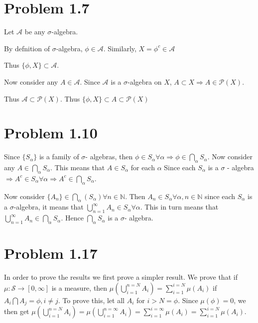 \documentclass[letterpaper,12pt]{article}
\theoremstyle{definition}
\begin{document}
 
 \section*{Problem 1.7}

Let $\mathcal{A}$ be any $\sigma$-algebra. 

By defnition of $\sigma$-algebra, $\phi \in \mathcal{A}$. Similarly, $X = {\phi}^c \in \mathcal{A}$

Thus $\{\phi, X\} \subset \mathcal{A}$.

 Now consider any $A \in \mathcal{A}$. Since $\mathcal{A}$ is a $\sigma$-algebra on $X$, $A \subset X \Rightarrow    A \in \mathcal{P}(X)$. 

Thus $\mathcal{A} \subset \mathcal{P}(X)$. Thus $\{\phi, X\} \subset A \subset \mathcal{P}(X)$

  \section*{Problem 1.10}

 Since $\{S_\alpha\}$ is a family of $\sigma$- algebras, then $\phi \in S_\alpha \forall \alpha \Rightarrow \phi \in    \bigcap_{\alpha}S_\alpha$. Now consider any $A \in  \bigcap_{\alpha}S_\alpha$. This means that $A \in S_\alpha$ for each $\alpha$
 Since each $S_\alpha$ is a $\sigma$ - algebra $\Rightarrow A^c \in S_\alpha \forall \alpha \Rightarrow A^c \in \bigcap_{\alpha}S_\alpha$.


  Now consider $\{A_n\} \in \bigcap_{\alpha}(S_\alpha) \forall n \in \mathbb{N}$. Then $A_n \in S_\alpha \forall \alpha, n \in \mathbb{N}$ since each $S_\alpha$ is a $\sigma$-algebra, it means that $\bigcup_{n=1}^{\infty}A_n \in S_\alpha \forall \alpha$. This in turn means that  $\bigcup_{n=1}^{\infty}A_n \in \bigcap_{\alpha}S_\alpha$. Hence $\bigcap_{\alpha}S_\alpha$ is a $\sigma$- algebra.


 \section*{Problem 1.17}
  In order to prove the results we first prove a simpler result. We prove that if $\mu: \mathcal{S} \rightarrow [0, \infty]$ is a measure, then    $\mu(\bigcup_{i=1}^{n=N}A_i) = \sum_{i=1}^{i=N}\mu(A_i)$ if $A_i \bigcap A_j = \phi, i \ne j$. To prove this, let all $A_i$ for $i > N =    \phi$.    Since $\mu(\phi)= 0$, we then get $\mu(\bigcup_{i=1}^{n=N}A_i) = \mu(\bigcup_{i=1}^{n=\infty}A_i) = \sum_{i=1}^{i=\infty}\mu(A_i) = \sum_{i=1}^{i=N}\mu(A_i)$.
\end{document}
